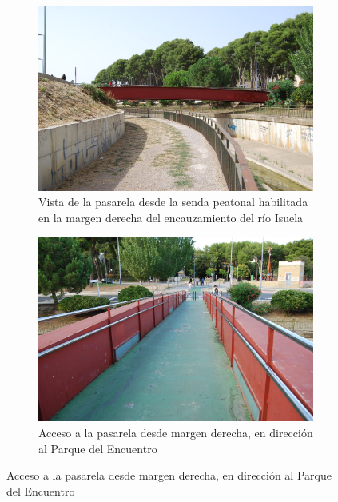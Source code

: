 \documentclass[a4paper,11pt ]{xc_webpage_project}
\renewcommand{\widhtLeftCol}{0.50\textwidth} %
\renewcommand{\widhtRightCol}{0.45\textwidth} %
\begin{document}
  \begin{figure}[h]
  \begin{subfigure}[l]{\widhtLeftCol}
  \centering
  \includegraphics[width=\textwidth]{figures/DSC_0321}
  \caption{Vista de la pasarela desde la senda peatonal habilitada en la margen derecha del encauzamiento del río Isuela}
  \end{subfigure}
\hfill
  \begin{subfigure}[r]{\widhtRightCol}
  \centering
  \includegraphics[width=\textwidth]{figures/DSC_0312}
  \caption{Acceso a la  pasarela desde margen derecha, en dirección al Parque del Encuentro}
  \end{subfigure}
  \end{figure}
\end{document}
